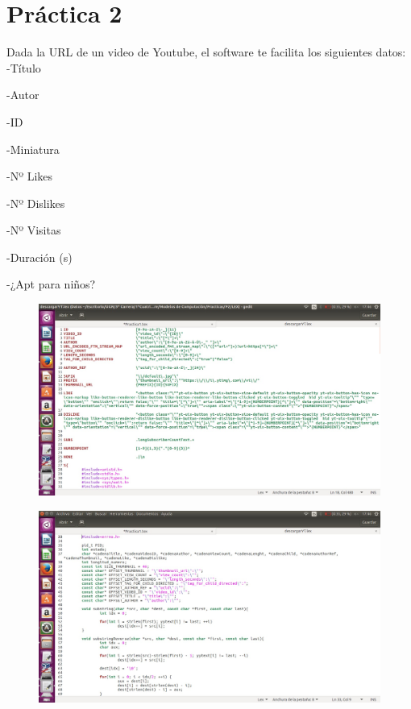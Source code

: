 \documentclass{article}
\begin{document}
\section{Práctica 2}
Dada la URL de un video de Youtube, el software te facilita los siguientes datos:
\hspace{1cm} -Título

\hspace{1cm} -Autor

\hspace{1cm} -ID

\hspace{1cm} -Miniatura

\hspace{1cm} -Nº Likes

\hspace{1cm} -Nº Dislikes

\hspace{1cm} -Nº Visitas

\hspace{1cm} -Duración (s)

\hspace{1cm} -¿Apt para niños?

\begin{figure}[!hp]
\includegraphics[width=\textwidth]{Captura de pantalla de 2018-01-07 17-46-40.jpg}
\centering
\end{figure}

\begin{figure}[!hp]
\includegraphics[width=\textwidth]{Captura de pantalla de 2018-01-07 17-46-55.jpg}
\centering
\end{figure}
\end{document}

